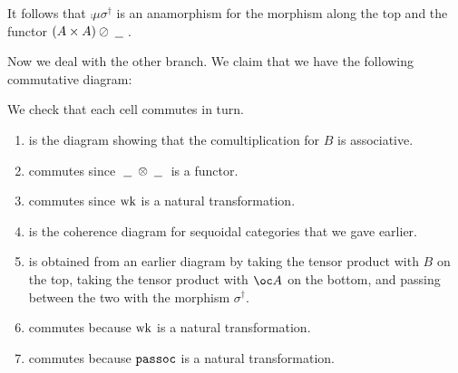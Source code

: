 \documentclass[11pt]{article} %
\begin{document}
It follows that $\comp\mu{\sigma^\dagger}$ is an anamorphism for the morphism along the top and the functor $(A\times A)\oslash\;\underline{\hspace{1.5ex}}\;$.  

Now we deal with the other branch.  We claim that we have the following commutative diagram:
\begin{longdiagram}
\end{longdiagram}

We check that each cell commutes in turn.
\begin{enumerate}[{\bf 1}]
  \item is the diagram showing that the comultiplication for $B$ is associative.
  \item commutes since $\;\underline{\hspace{1.5ex}}\;\otimes\;\underline{\hspace{1.5ex}}\;$ is a functor.
  \item commutes since $\operatorname{wk}$ is a natural transformation.
  \item is the coherence diagram for sequoidal categories that we gave earlier.
  \item is obtained from an earlier diagram by taking the tensor product with $B$ on the top, taking the tensor product with $\oc A$ on the bottom, and passing between the two with the morphism $\sigma^\dag$.  
  \item commutes because $\operatorname{wk}$ is a natural transformation.
  \item commutes because ${\texttt{passoc}}$ is a natural transformation.  
\end{enumerate}
\end{document}
